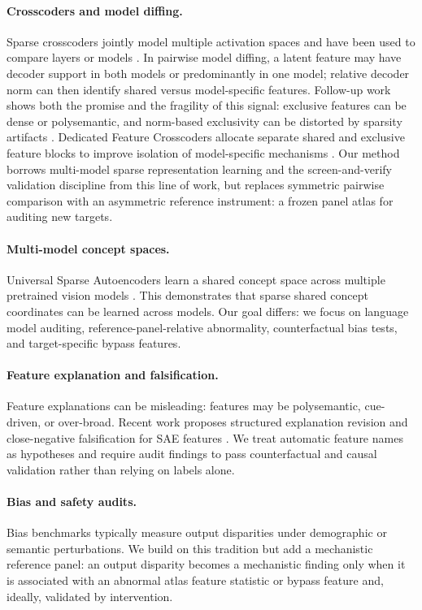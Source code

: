 \documentclass[11pt]{article}
\begin{document}
\paragraph{Crosscoders and model diffing.}
Sparse crosscoders jointly model multiple activation spaces and have been used to compare layers or models \citep{lindsey2024crosscoders}. In pairwise model diffing, a latent feature may have decoder support in both models or predominantly in one model; relative decoder norm can then identify shared versus model-specific features. Follow-up work shows both the promise and the fragility of this signal: exclusive features can be dense or polysemantic, and norm-based exclusivity can be distorted by sparsity artifacts \citep{lindsey2025crosscoderinsights,minder2025crosscoderartifacts}. Dedicated Feature Crosscoders allocate separate shared and exclusive feature blocks to improve isolation of model-specific mechanisms \citep{ren2026dfc}. Our method borrows multi-model sparse representation learning and the screen-and-verify validation discipline from this line of work, but replaces symmetric pairwise comparison with an asymmetric reference instrument: a frozen panel atlas for auditing new targets.

\paragraph{Multi-model concept spaces.}
Universal Sparse Autoencoders learn a shared concept space across multiple pretrained vision models \citep{thasarathan2025usae}. This demonstrates that sparse shared concept coordinates can be learned across models. Our goal differs: we focus on language model auditing, reference-panel-relative abnormality, counterfactual bias tests, and target-specific bypass features.

\paragraph{Feature explanation and falsification.}
Feature explanations can be misleading: features may be polysemantic, cue-driven, or over-broad. Recent work proposes structured explanation revision and close-negative falsification for SAE features \citep{ma2025revising}. We treat automatic feature names as hypotheses and require audit findings to pass counterfactual and causal validation rather than relying on labels alone.

\paragraph{Bias and safety audits.}
Bias benchmarks typically measure output disparities under demographic or semantic perturbations. We build on this tradition but add a mechanistic reference panel: an output disparity becomes a mechanistic finding only when it is associated with an abnormal atlas feature statistic or bypass feature and, ideally, validated by intervention.
\end{document}
